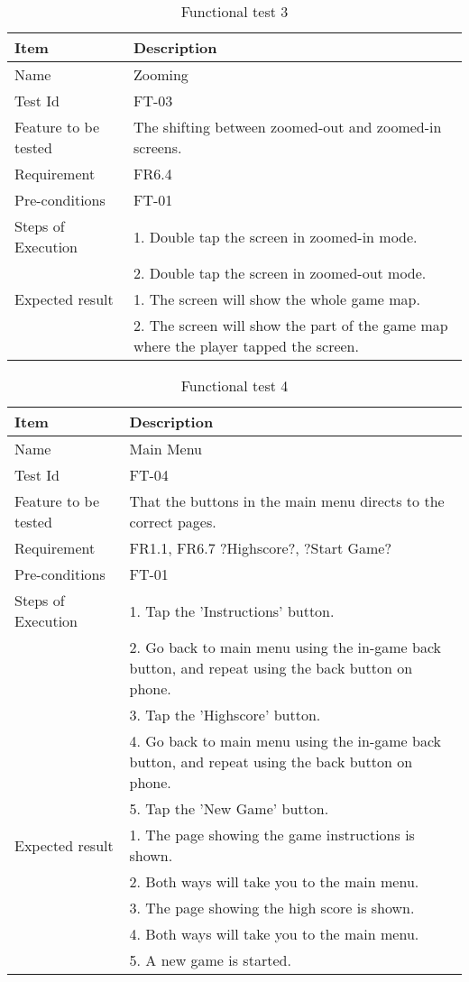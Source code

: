 \begin{table}[H]
\centering
	\begin{tabular}{ l | p{8cm} }
		\hline
		{\bf Item} & {\bf Description} \\ \hline
		Name & Zooming \\ 
		Test Id & FT-03 \\ 
		Feature to be tested & The shifting between zoomed-out and zoomed-in screens. \\ 
		Requirement & FR6.4 \\ 
		Pre-conditions & FT-01 \\ 
		Steps of Execution & 1. Double tap the screen in zoomed-in mode.\\ 
		& 2. Double tap the screen in zoomed-out mode. \\
		Expected result & 1. The screen will show the whole game map. \\
		& 2. The screen will show the part of the game map where the player tapped the screen. \\
	\end{tabular}
	\caption{Functional test 3}
\end{table}

\begin{table}[H]
\centering
	\begin{tabular}{ l | p{8cm} }
		\hline
		{\bf Item} & {\bf Description} \\ \hline
		Name & Main Menu \\ 
		Test Id & FT-04 \\ 
		Feature to be tested & That the buttons in the main menu directs to the correct pages. \\ 
		Requirement & FR1.1, FR6.7 ?Highscore?, ?Start Game? \\ 
		Pre-conditions & FT-01 \\ 
		Steps of Execution & 1. Tap the 'Instructions' button. \\
		& 2. Go back to main menu using the in-game back button, and repeat using the back button on phone. \\
		& 3. Tap the 'Highscore' button. \\
		& 4. Go back to main menu using the in-game back button, and repeat using the back button on phone. \\
		& 5. Tap the 'New Game' button. \\
		Expected result & 1. The page showing the game instructions is shown. \\
		& 2. Both ways will take you to the main menu. \\
		& 3. The page showing the high score is shown. \\
		& 4. Both ways will take you to the main menu. \\
		& 5. A new game is started. \\
	\end{tabular}
	\caption{Functional test 4}
\end{table}

